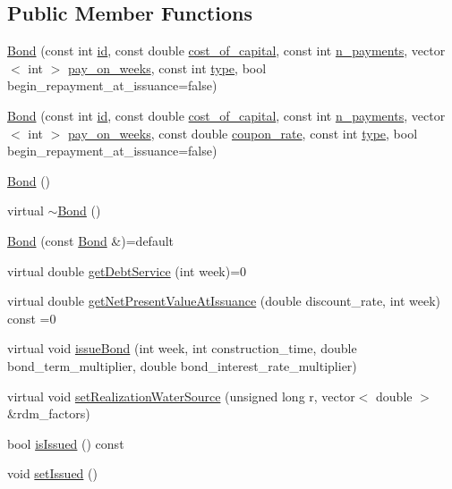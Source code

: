 \subsection*{Public Member Functions}
\begin{DoxyCompactItemize}
\item 
\mbox{\hyperlink{classBond_ac2ed54d795433c9c6a4236629553fb83}{Bond}} (const int \mbox{\hyperlink{classBond_a7f75bcafbc16676ad6dbafbf40afae4a}{id}}, const double \mbox{\hyperlink{classBond_ad98df7d28b398e620286f95ee085439b}{cost\+\_\+of\+\_\+capital}}, const int \mbox{\hyperlink{classBond_a4a227b6de2eeada118d82ab1633b1db8}{n\+\_\+payments}}, vector$<$ int $>$ \mbox{\hyperlink{classBond_ae8dd46fcbf95c993460ffe4ea1f52739}{pay\+\_\+on\+\_\+weeks}}, const int \mbox{\hyperlink{classBond_a48da24878beedd71cbaa990cea860667}{type}}, bool begin\+\_\+repayment\+\_\+at\+\_\+issuance=false)
\item 
\mbox{\hyperlink{classBond_a8758b7ef325a779eeee87eb91947ce58}{Bond}} (const int \mbox{\hyperlink{classBond_a7f75bcafbc16676ad6dbafbf40afae4a}{id}}, const double \mbox{\hyperlink{classBond_ad98df7d28b398e620286f95ee085439b}{cost\+\_\+of\+\_\+capital}}, const int \mbox{\hyperlink{classBond_a4a227b6de2eeada118d82ab1633b1db8}{n\+\_\+payments}}, vector$<$ int $>$ \mbox{\hyperlink{classBond_ae8dd46fcbf95c993460ffe4ea1f52739}{pay\+\_\+on\+\_\+weeks}}, const double \mbox{\hyperlink{classBond_a5f66785534e24caa43d9f730130a6463}{coupon\+\_\+rate}}, const int \mbox{\hyperlink{classBond_a48da24878beedd71cbaa990cea860667}{type}}, bool begin\+\_\+repayment\+\_\+at\+\_\+issuance=false)
\item 
\mbox{\hyperlink{classBond_a5b809c10637a30a2b24ed01609d68711}{Bond}} ()
\item 
virtual \mbox{\hyperlink{classBond_a6072f41bd412cb66b4fb13833a14d0ec}{$\sim$\+Bond}} ()
\item 
\mbox{\hyperlink{classBond_acaa8874ed5e81057eeb7dc55fb6b5373}{Bond}} (const \mbox{\hyperlink{classBond}{Bond}} \&)=default
\item 
virtual double \mbox{\hyperlink{classBond_a98d8ecaf4b36319674ebd220598996bc}{get\+Debt\+Service}} (int week)=0
\item 
virtual double \mbox{\hyperlink{classBond_a5997278813deb16aa5d01bbca8ecc7b2}{get\+Net\+Present\+Value\+At\+Issuance}} (double discount\+\_\+rate, int week) const =0
\item 
virtual void \mbox{\hyperlink{classBond_a377db8c18b83c4666e46686bc26adef1}{issue\+Bond}} (int week, int construction\+\_\+time, double bond\+\_\+term\+\_\+multiplier, double bond\+\_\+interest\+\_\+rate\+\_\+multiplier)
\item 
virtual void \mbox{\hyperlink{classBond_a19fd997eed14b4cb4151063c24a13cdd}{set\+Realization\+Water\+Source}} (unsigned long r, vector$<$ double $>$ \&rdm\+\_\+factors)
\item 
bool \mbox{\hyperlink{classBond_a6342f3dd3295771b71ac1fcc3b666a42}{is\+Issued}} () const
\item 
void \mbox{\hyperlink{classBond_a573de514b0044cec6a76bb63b098b40a}{set\+Issued}} ()
\end{DoxyCompactItemize}
